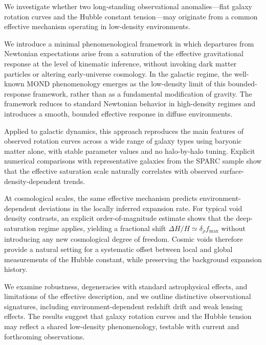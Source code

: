 We investigate whether two long-standing observational anomalies---flat galaxy
rotation curves and the Hubble constant tension---may originate from a common
effective mechanism operating in low-density environments.

We introduce a minimal phenomenological framework in which departures from
Newtonian expectations arise from a saturation of the effective gravitational
response at the level of kinematic inference, without invoking dark matter
particles or altering early-universe cosmology.
In the galactic regime, the well-known MOND phenomenology emerges as the
low-density limit of this bounded-response framework, rather than as a
fundamental modification of gravity.
The framework reduces to standard Newtonian behavior in high-density regimes
and introduces a smooth, bounded effective response in diffuse environments.

Applied to galactic dynamics, this approach reproduces the main features of
observed rotation curves across a wide range of galaxy types using baryonic
matter alone, with stable parameter values and no halo-by-halo tuning.
Explicit numerical comparisons with representative galaxies from the SPARC
sample show that the effective saturation scale naturally correlates with
observed surface-density-dependent trends.

At cosmological scales, the same effective mechanism predicts
environment-dependent deviations in the locally inferred expansion rate.
For typical void density contrasts, an explicit order-of-magnitude estimate
shows that the deep-saturation regime applies, yielding a fractional shift
$\Delta H/H \simeq \delta_\rho f_{\max}$ without introducing any new
cosmological degree of freedom.
Cosmic voids therefore provide a natural setting for a systematic offset
between local and global measurements of the Hubble constant, while
preserving the background expansion history.

We examine robustness, degeneracies with standard astrophysical effects, and
limitations of the effective description, and we outline distinctive
observational signatures, including environment-dependent redshift drift and
weak lensing effects.
The results suggest that galaxy rotation curves and the Hubble tension may
reflect a shared low-density phenomenology, testable with current and
forthcoming observations.
